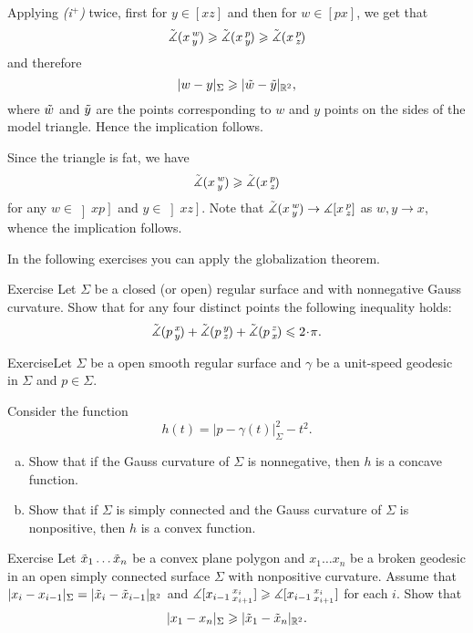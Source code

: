 Applying \textit{(i$^{+}$)} twice, first for $y\in [xz]$ and then for $w\in [px]$, we get that
\[\angk xwy \ge \angk xpy \ge \angk xpz\]
and therefore
\[|w-y|_\Sigma\ge |\~w-\~y|_{\RR^2},\]
where $\~w$ and $\~y$ are the points corresponding to $w$ and $y$ points on the sides of the model triangle. Hence the implication follows.

Since the triangle is fat, we have 
\[\angk xwy \ge \angk xpz\]
for any $w\in \left]xp\right]$ and $y\in \left]xz\right]$.
Note that $\angk xwy\to \measuredangle\hinge xpz$ as $w,y\to x$, whence the implication follows.
\qeds

In the following exercises you can apply the globalization theorem.

\begin{thm}{Exercise}
Let $\Sigma$ be a closed (or open) regular surface and with nonnegative Gauss curvature.
Show that for any four distinct points the following inequality holds:
\[\angk pxy+\angk pyz+\angk pzx\le2\cdot \pi.\]

\end{thm}

\begin{thm}{Exercise}Let $\Sigma$ be a open smooth regular surface
and $\gamma$ be a unit-speed geodesic in $\Sigma$ and $p\in\Sigma$.

Consider the function
\[h(t)=|p-\gamma(t)|_\Sigma^2-t^2.\]

\begin{enumerate}[(a)]
\item Show that if the Gauss curvature of $\Sigma$ is nonnegative, then $h$ is a concave function.
\item Show that if $\Sigma$ is simply connected and the Gauss curvature of $\Sigma$ is nonpositive, then $h$ is a convex function.
\end{enumerate}
\end{thm}

\begin{thm}{Exercise}
Let $\~x_1\dots\~x_n$ be a convex plane polygon and
$x_1\dots x_n$ be a broken geodesic in an open simply connected surface $\Sigma$ with nonpositive curvature.
Assume that
$|x_i-x_{i-1}|_\Sigma=|\~x_i-\~x_{i-1}|_{\RR^2}$ and
$\measuredangle\hinge{x_{i-1}}{x_i}{x_{i+1}}\ge \measuredangle\hinge{x_{i-1}}{x_i}{x_{i+1}}$
 for each $i$.
Show that \[|x_1-x_n|_\Sigma\ge |\~x_1\z-\~x_n|_{\RR^2}.\]
\end{thm}

